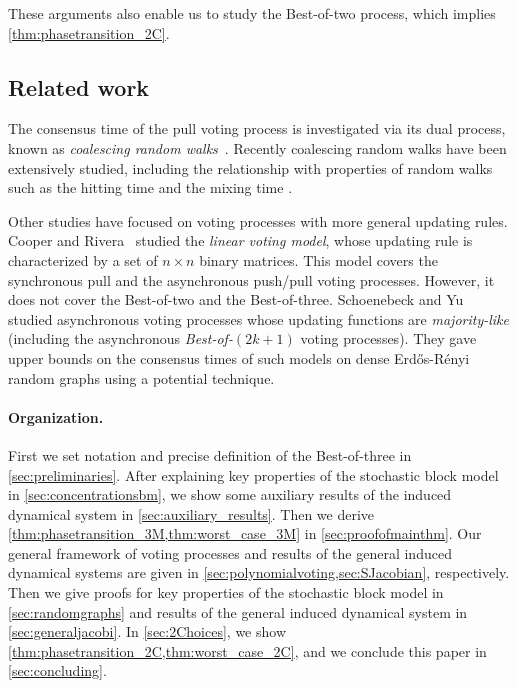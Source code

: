\documentclass[letterpaper,11pt]{article}
\begin{document}
These arguments also enable us to study the Best-of-two process, which implies \cref{thm:phasetransition_2C}.

\subsection{Related work}
The consensus time of the pull voting process is investigated via its dual process, known as \emph{coalescing random walks}~\cite{HP01, CEOR13, CR16}.
Recently coalescing random walks have been extensively studied, including the relationship with properties of random walks such as the hitting time and the mixing time \cite{KMS19, OP19}.

Other studies have focused on voting processes with more general updating rules.
Cooper and Rivera~\cite{CR16} studied the {\em linear voting model}, whose updating rule is characterized by a set of $n\times n$ binary matrices.
This model covers the synchronous pull and the asynchronous push/pull voting processes. 
However, it does not cover the Best-of-two and the Best-of-three.
Schoenebeck and Yu~\cite{SY18} studied asynchronous voting processes whose updating functions are {\em majority-like} (including the asynchronous {\em Best-of-$(2k+1)$} voting processes).
They gave upper bounds on the consensus times of such models on dense Erd\H{o}s-R\'enyi random graphs using a potential technique.
%

\paragraph*{Organization.}
First we set notation and precise definition of the Best-of-three in \cref{sec:preliminaries}.
After explaining key properties of the stochastic block model in \cref{sec:concentrationsbm},
we show some auxiliary results of the induced dynamical system in \cref{sec:auxiliary_results}.
Then we derive \cref{thm:phasetransition_3M,thm:worst_case_3M} in \cref{sec:proofofmainthm}.
%
Our general framework of voting processes and results of the general induced dynamical systems are given in \cref{sec:polynomialvoting,sec:SJacobian}, respectively.
Then we give proofs for key properties of the stochastic block model in \cref{sec:randomgraphs} and 
results of the general induced dynamical system in \cref{sec:generaljacobi}.
In \cref{sec:2Choices}, we show \cref{thm:phasetransition_2C,thm:worst_case_2C},
and we conclude this paper in \cref{sec:concluding}.

\end{document}
